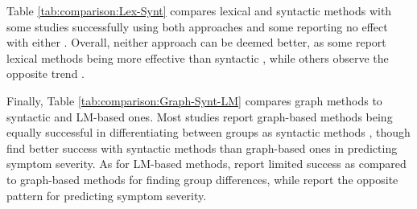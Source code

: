 Table \ref{tab:comparison:Lex-Synt} compares lexical and syntactic methods with some studies successfully using both approaches \citep{mitchell2015quantifying, just2020modeling, jeong2023exploring} and some reporting no effect with either \citep{liang2022widespread}. Overall, neither approach can be deemed better, as some report lexical methods being more effective than syntactic \citep{gupta2018automated, rezaii2019machine}, while others observe the opposite trend \citep{schneider2023syntactic, argolo2023burnishing}.

\begin{table}[h]
\captionsetup{width=\textwidth}
\caption[Comparison of lexical and syntactic methods.]{\label{tab:comparison:Lex-Synt} Comparison between lexical and syntactic methods. 
\\ ``+'' indicates significant group difference or correlation for most metrics tested within the group. ``?'' indicates mixed results with some metrics showing significant results but not others. ``!'' indicates absence of significant differences in the metrics tested. The studies on clinical high risk populations are shown in italics.}
\end{table}

Finally, Table \ref{tab:comparison:Graph-Synt-LM} compares graph methods to syntactic and LM-based ones. Most studies report graph-based methods being equally successful in differentiating between groups as syntactic methods \citep{spencer2021lower, morgan2021natural, nettekoven2023semantic}, though \citet{argolo2023burnishing} find better success with syntactic methods than graph-based ones in predicting symptom severity. As for LM-based methods, \citet{morgan2021natural} report limited success as compared to graph-based methods for finding group differences, while \citet{argolo2023burnishing} report the opposite pattern for predicting symptom severity.

